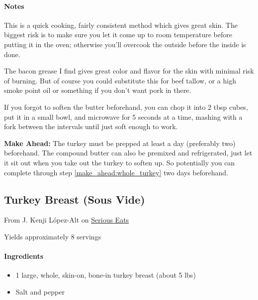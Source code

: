 \documentclass[12pt]{article}
\newenvironment*{ingredients}
	{
		\paragraph*{Ingredients}
		\begin{itemize}
	}
	{
		\end{itemize}
	}
\newenvironment*{notes}
	{
		\paragraph*{Notes}
		\begin{adjustwidth}{1cm}{}
	}
	{
		\end{adjustwidth}
	}
\begin{document}
	\begin{notes}
		This is a quick cooking, fairly consistent method which gives great skin. The biggest risk is to make sure you let it come up to room temperature before putting it in the oven; otherwise you'll overcook the outside before the inside is done.
		
		The bacon grease I find gives great color and flavor for the skin with minimal risk of burning. But of course you could substitute this for beef tallow, or a high smoke point oil or something if you don't want pork in there.
		
		If you forgot to soften the butter beforehand, you can chop it into 2 tbsp cubes, put it in a small bowl, and microwave for 5 seconds at a time, mashing with a fork between the intervals until just soft enough to work.
		
		\textbf{Make Ahead:} The turkey must be prepped at least a day (preferably two) beforehand. The compound butter can also be premixed and refrigerated, just let it sit out when you take out the turkey to soften up. So potentially you can complete through step \ref{make_ahead:whole_turkey} two days beforehand.
	\end{notes}
	
	\newpage
	
	\subsection{Turkey Breast (Sous Vide)}
	From J. Kenji L\'{o}pez-Alt on \href{https://www.seriouseats.com/sous-vide-turkey-breast-crispy-skin-recipe-thanksgiving}{Serious Eats}
	
	Yields approximately 8 servings
	
	\begin{ingredients}
		\item 1 large, whole, skin-on, bone-in turkey breast (about 5 lbs)
		\item Salt and pepper
	\end{ingredients}
	
\end{document}
